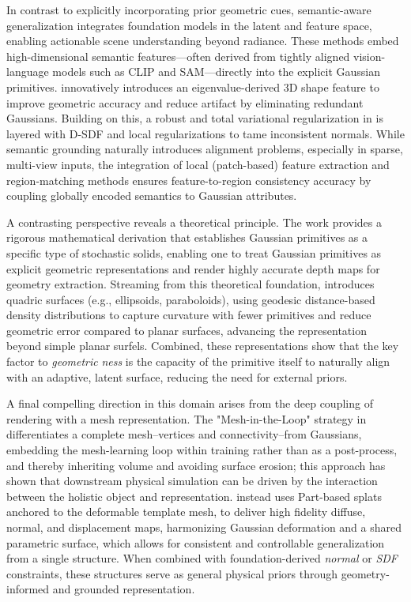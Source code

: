 \documentclass[11pt,a4paper]{article}
\begin{document}
In contrast to explicitly incorporating prior geometric cues, semantic-aware generalization integrates foundation models in the latent and feature space, enabling actionable scene understanding beyond radiance. These methods embed high-dimensional semantic features---often derived from tightly aligned vision-language models such as CLIP and SAM---directly into the explicit Gaussian primitives. \cite{arxiv:2501.17655v1} innovatively introduces an eigenvalue-derived 3D shape feature to improve geometric accuracy and reduce artifact by eliminating redundant Gaussians. Building on this, a robust and total variational regularization in \cite{arxiv:2506.02751v3} is layered with D-SDF and local regularizations to tame inconsistent normals. While semantic grounding naturally introduces alignment problems, especially in sparse, multi-view inputs, the integration of local (patch-based) feature extraction and region-matching methods ensures feature-to-region consistency accuracy by coupling globally encoded semantics to Gaussian attributes.

A contrasting perspective reveals a theoretical principle. The work \cite{arxiv:2601.17835v2} provides a rigorous mathematical derivation that establishes Gaussian primitives as a specific type of stochastic solids, enabling one to treat Gaussian primitives as explicit geometric representations and render highly accurate depth maps for geometry extraction. Streaming from this theoretical foundation, \cite{arxiv:2601.17835v2} introduces quadric surfaces (e.g., ellipsoids, paraboloids), using geodesic distance-based density distributions to capture curvature with fewer primitives and reduce geometric error compared to planar surfaces, advancing the representation beyond simple planar surfels. Combined, these representations show that the key factor to \emph{geometric} \emph{ness} is the capacity of the primitive itself to naturally align with an adaptive, latent surface, reducing the need for external priors.

A final compelling direction in this domain arises from the deep coupling of rendering with a mesh representation. The "Mesh-in-the-Loop" strategy in \cite{arxiv:2506.24096v2} differentiates a complete mesh--vertices and connectivity--from Gaussians, embedding the mesh-learning loop within training rather than as a post-process, and thereby inheriting volume and avoiding surface erosion; this approach has shown that downstream physical simulation can be driven by the interaction between the holistic object and representation. \cite{arxiv:2604.24918v1} instead uses Part-based splats anchored to the deformable template mesh, to deliver high fidelity diffuse, normal, and displacement maps, harmonizing Gaussian deformation and a shared parametric surface, which allows for consistent and controllable generalization from a single structure. When combined with foundation-derived \emph{normal} or \emph{SDF} constraints, these structures serve as general physical priors through geometry-informed and grounded representation.
\end{document}
